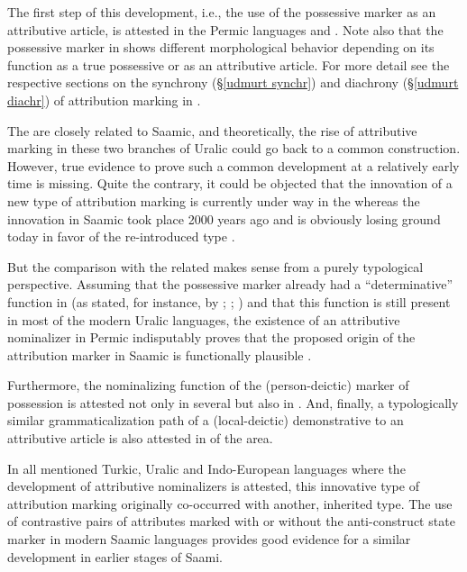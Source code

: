 {The first step of this development, i.e., the use of the possessive marker as an attributive article, is attested in the Permic languages  and . Note also that the possessive marker in  shows different morphological behavior depending on its function as a true possessive or as an attributive article. For more detail see the respective sections on the synchrony (\S\ref{udmurt synchr}) and diachrony (\S\ref{udmurt diachr}) of attribution marking in .

The  are closely related to Saamic, and theoretically, the rise of attributive marking in these two branches of Uralic could go back to a common  construction. However, true evidence to prove such a common development at a relatively early time is missing. Quite the contrary, it could be objected that the innovation of a new type of attribution marking is currently under way in the  whereas the innovation in Saamic took place 2000 years ago and is obviously losing ground today in favor of the re-introduced type .

But the comparison with the related  makes sense from a purely typological perspective. Assuming that the possessive marker already had a “determinative” function in  (as stated, for instance, by \citealt[32]{janhunen1981}; \citealt[66, 81]{decsy1990}; \citealt{kunnap2004}) and that this function is still present in most of the modern Uralic languages, the existence of an attributive nominalizer in Permic indisputably proves that the proposed origin of the attribution marker in Saamic is functionally plausible \citep{riesler2006b}.

Furthermore, the nominalizing function of the (person-deictic) marker of possession is attested not only in several  but also in . And, finally, a typologically similar grammaticalization path of a (local-deictic) demonstrative to an attributive article is also attested in  of the area.

In all mentioned Turkic, Uralic and Indo-European languages where the development of attributive nominalizers is attested, this innovative type of attribution marking originally co-occurred with another, inherited type. The use of contrastive pairs of attributes marked with or without the anti\hyp{}construct state marker in modern Saamic languages provides good evidence for a similar development in earlier stages of Saami.

}
